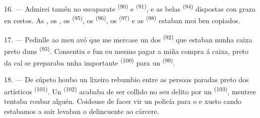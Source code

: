 16. --- Admirei tamén no escaparate  \textsuperscript{(90)} e
 \textsuperscript{(91)}, e as belas  \textsuperscript{(94)} dispostas con graza en cestos. As
, os , os 
\textsuperscript{(95)}, os  \textsuperscript{(96)}, os
 \textsuperscript{(97)} e as 
\textsuperscript{(98)} estaban moi ben copiados.

\VUsaut{4.4mm}
\VUsaut{2.8mm}

17. --- Pedinlle ao meu avó que me mercase un dos 
\textsuperscript{(92)} que estaban nunha caixa preto duns 
\textsuperscript{(93)}. Consentiu e fun eu mesmo pagar a miña compra á caixa, preto da
cal se preparaba unha importante  \textsuperscript{(100)} para un
 \textsuperscript{(99)}.

18. --- De súpeto houbo un lixeiro rebumbio entre as persoas paradas preto dos
 artísticos \textsuperscript{(101)}. Un 
\textsuperscript{(102)} acababa de ser collido no seu delito por un 
\textsuperscript{(103)}, mentres tentaba roubar alguén. Coidouse de facer vir un
policía para o  e xusto cando estabamos a saír levaban o delincuente ao
cárcere.
